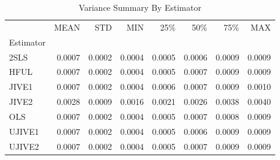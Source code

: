 \begin{table}[ht]
\centering
\caption{Variance Summary By Estimator}
\begin{tabular}{lrrrrrrr}
\toprule
 & MEAN & STD & MIN & 25\% & 50\% & 75\% & MAX \\
Estimator &  &  &  &  &  &  &  \\
\midrule
2SLS & 0.0007 & 0.0002 & 0.0004 & 0.0005 & 0.0006 & 0.0009 & 0.0009 \\
HFUL & 0.0007 & 0.0002 & 0.0004 & 0.0005 & 0.0007 & 0.0009 & 0.0009 \\
JIVE1 & 0.0007 & 0.0002 & 0.0004 & 0.0006 & 0.0007 & 0.0009 & 0.0010 \\
JIVE2 & 0.0028 & 0.0009 & 0.0016 & 0.0021 & 0.0026 & 0.0038 & 0.0040 \\
OLS & 0.0007 & 0.0002 & 0.0004 & 0.0005 & 0.0007 & 0.0008 & 0.0009 \\
UJIVE1 & 0.0007 & 0.0002 & 0.0004 & 0.0005 & 0.0006 & 0.0009 & 0.0009 \\
UJIVE2 & 0.0007 & 0.0002 & 0.0004 & 0.0005 & 0.0007 & 0.0009 & 0.0009 \\
\bottomrule
\end{tabular}
\end{table}
